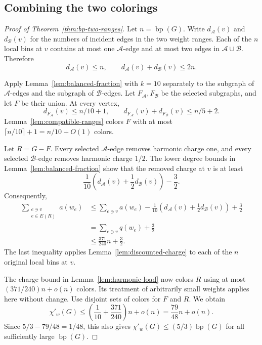 \documentclass[11pt]{article}
\theoremstyle{definition}\newtheorem{algorithm}{Algorithm}[section]
\numberwithin{equation}{section}
\theoremstyle{remark}\newtheorem*{remark}{Remark}
\newcommand{\bp}{\operatorname{bp}}
\begin{document}
\subsection{Combining the two colorings}
\label{sec:mixed-bound-proof}

\begin{proof}[Proof of Theorem~\ref{thm:bp-two-ranges}]
Let $n=\bp(G)$. Write $d_{\mathcal A}(v)$ and
$d_{\mathcal B}(v)$ for the numbers of incident edges in the two weight
ranges. Each of the $n$ local bins at $v$ contains at most one
$\mathcal A$-edge and at most two edges in
$\mathcal A\cup\mathcal B$. Therefore
\[
 d_{\mathcal A}(v)\le n,\qquad
 d_{\mathcal A}(v)+d_{\mathcal B}(v)\le2n.
\]

Apply Lemma~\ref{lem:balanced-fraction} with $k=10$ separately to
the subgraph of $\mathcal A$-edges and the subgraph of
$\mathcal B$-edges. Let $F_{\mathcal A},F_{\mathcal B}$ be the selected
subgraphs, and let $F$ be their union. At every vertex,
\[
 d_{F_{\mathcal A}}(v)\le n/10+1,\qquad
 d_{F_{\mathcal A}}(v)+d_{F_{\mathcal B}}(v)\le n/5+2.
\]
Lemma~\ref{lem:compatible-ranges} colors $F$ with at most
$\lceil n/10\rceil+1=n/10+O(1)$ colors.

Let $R=G-F$. Every selected $\mathcal A$-edge removes harmonic charge
one, and every selected $\mathcal B$-edge removes harmonic charge
$1/2$. The lower degree bounds in
Lemma~\ref{lem:balanced-fraction} show that the removed charge at
$v$ is at least
\[
 \frac1{10}\left(d_{\mathcal A}(v)
                   +\frac12d_{\mathcal B}(v)\right)-\frac32.
\]
Consequently,
\begin{align*}
 \sum_{\substack{e\ni v\\e\in E(R)}}a(w_e)
 &\le\sum_{e\ni v}a(w_e)
       -\frac1{10}\left(d_{\mathcal A}(v)
                         +\frac12d_{\mathcal B}(v)\right)+\frac32\\
 &=\sum_{e\ni v}q(w_e)+\frac32\\
 &\le\frac{371}{240}n+\frac32.
\end{align*}
The last inequality applies Lemma~\ref{lem:discounted-charge} to each of
the $n$ original local bins at $v$.

The charge bound in Lemma~\ref{lem:harmonic-load} now colors $R$
using at most $(371/240)n+o(n)$ colors. Its treatment of arbitrarily
small weights applies here without change. Use disjoint sets of colors
for $F$ and $R$. We obtain
\[
 \chi'_w(G)
 \le\left(\frac1{10}+\frac{371}{240}\right)n+o(n)
 =\frac{79}{48}n+o(n).
\]
Since $5/3-79/48=1/48$, this also gives
$\chi'_w(G)\le(5/3)\bp(G)$ for all sufficiently large $\bp(G)$.
\end{proof}
\end{document}
